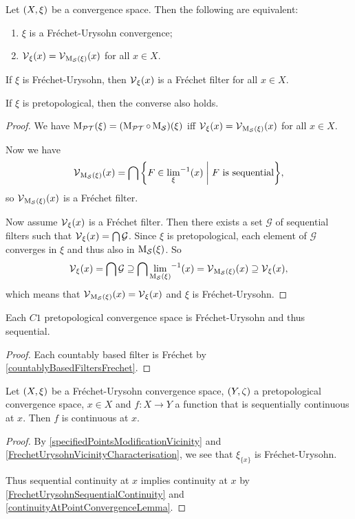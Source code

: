 \begin{proposition} \label{FrechetUrysohnVicinityCharacterisation}
Let $\sSet{X,\xi}$ be a convergence space. Then the following are equivalent:
\begin{enumerate}
\item $\xi$ is a Fréchet-Urysohn convergence;
\item $\operatorname{\mathcal{V}}_\xi(x) = \operatorname{\mathcal{V}}_{\operatorname{M_\mathcal{S}}(\xi)}(x)$ for all $x\in X$.
\end{enumerate}
If $\xi$ is Fréchet-Urysohn, then $\operatorname{\mathcal{V}}_\xi(x)$ is a Fréchet filter for all $x\in X$.

If $\xi$ is pretopological, then the converse also holds.
\end{proposition}
\begin{proof}
We have $\operatorname{M_\mathcal{PT}}(\xi) = (\operatorname{M_\mathcal{PT}}\circ \operatorname{M_\mathcal{S}})(\xi)$ iff $\operatorname{\mathcal{V}}_\xi(x) = \operatorname{\mathcal{V}}_{\operatorname{M_\mathcal{S}}(\xi)}(x)$ for all $x\in X$.

Now we have
\[ \vicinity_{\seqMod(\xi)}(x) = \bigcap\setbuilder{F\in {\lim_{\xi}}^{-1}(x)}{\text{$F$ is sequential}}, \]
so $\operatorname{\mathcal{V}}_{\operatorname{M_\mathcal{S}}(\xi)}(x)$ is a Fréchet filter.

Now assume $\operatorname{\mathcal{V}}_\xi(x)$ is a Fréchet filter. Then there exists a set $\mathcal{G}$ of sequential filters such that $\operatorname{\mathcal{V}}_\xi(x) = \bigcap \mathcal{G}$. Since $\xi$ is pretopological, each element of $\mathcal{G}$ converges in $\xi$ and thus also in $\operatorname{M_\mathcal{S}}(\xi)$. So
\[ \operatorname{\mathcal{V}}_\xi(x) = \bigcap \mathcal{G} \supseteq \bigcap {\lim_{\operatorname{M_\mathcal{S}}(\xi)}}^{-1}(x) = \operatorname{\mathcal{V}}_{\operatorname{M_\mathcal{S}}(\xi)}(x) \supseteq \operatorname{\mathcal{V}}_{\xi}(x), \]
which means that $\operatorname{\mathcal{V}}_{\operatorname{M_\mathcal{S}}(\xi)}(x) = \operatorname{\mathcal{V}}_{\xi}(x)$ and $\xi$ is Fréchet-Urysohn.
\end{proof}
\begin{corollary} \label{C1ImpliesFrechetUrysohn}
Each $C1$ pretopological convergence space is Fréchet-Urysohn and thus sequential.
\end{corollary}
\begin{proof}
Each countably based filter is Fréchet by \ref{countablyBasedFiltersFrechet}.
\end{proof}

\begin{lemma} \label{FrechetUrysohnSequentialContinuityAtAPoint}
Let $\sSet{X,\xi}$ be a Fréchet-Urysohn convergence space, $\sSet{Y,\zeta}$ a pretopological convergence space, $x\in X$ and $f: X\to Y$ a function that is sequentially continuous at $x$. Then $f$ is continuous at $x$.
\end{lemma}
\begin{proof}
By \ref{specifiedPointsModificationVicinity} and \ref{FrechetUrysohnVicinityCharacterisation}, we see that $\xi_{\{x\}}$ is Fréchet-Urysohn.

Thus sequential continuity at $x$ implies continuity at $x$ by \ref{FrechetUrysohnSequentialContinuity} and \ref{continuityAtPointConvergenceLemma}.
\end{proof}

